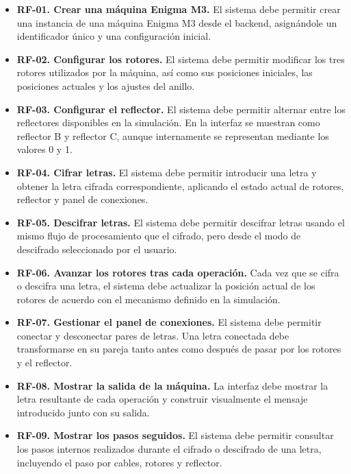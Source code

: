 \begin{itemize}
	\item \textbf{RF-01. Crear una máquina Enigma M3.} El sistema debe permitir crear una instancia de una máquina Enigma M3 desde el backend, asignándole un identificador único y una configuración inicial.
	
	\item \textbf{RF-02. Configurar los rotores.} El sistema debe permitir modificar los tres rotores utilizados por la máquina, así como sus posiciones iniciales, las posiciones actuales y los ajustes del anillo.
	
	\item \textbf{RF-03. Configurar el reflector.} El sistema debe permitir alternar entre los reflectores disponibles en la simulación. En la interfaz se muestran como reflector B y reflector C, aunque internamente se representan mediante los valores 0 y 1.
	
	\item \textbf{RF-04. Cifrar letras.} El sistema debe permitir introducir una letra y obtener la letra cifrada correspondiente, aplicando el estado actual de rotores, reflector y panel de conexiones.
	
	\item \textbf{RF-05. Descifrar letras.} El sistema debe permitir descifrar letras usando el mismo flujo de procesamiento que el cifrado, pero desde el modo de descifrado seleccionado por el usuario.
	
	\item \textbf{RF-06. Avanzar los rotores tras cada operación.} Cada vez que se cifra o descifra una letra, el sistema debe actualizar la posición actual de los rotores de acuerdo con el mecanismo definido en la simulación.
	
	\item \textbf{RF-07. Gestionar el panel de conexiones.} El sistema debe permitir conectar y desconectar pares de letras. Una letra conectada debe transformarse en su pareja tanto antes como después de pasar por los rotores y el reflector.
	
	\item \textbf{RF-08. Mostrar la salida de la máquina.} La interfaz debe mostrar la letra resultante de cada operación y construir visualmente el mensaje introducido junto con su salida.
	
	\item \textbf{RF-09. Mostrar los pasos seguidos.} El sistema debe permitir consultar los pasos internos realizados durante el cifrado o descifrado de una letra, incluyendo el paso por cables, rotores y reflector.
	

\end{itemize}
